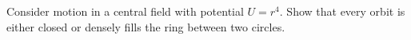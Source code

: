 Consider motion in a central field with potential $U = r^4$. Show that every orbit is either closed or densely fills the ring between two circles.
